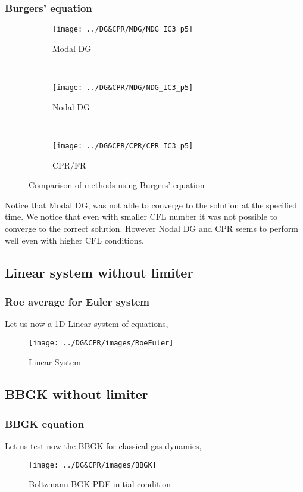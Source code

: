 \begin{frame} \frametitle{Burgers' equation}
	\begin{figure}
        \centering
        \begin{subfigure}[b]{0.31\textwidth}
                \centering
                \texttt{[image: ../DG\&CPR/MDG/MDG\_IC3\_p5]}
                \caption{Modal DG}
                \label{fig:MDG_IC3_p5_averages}
        \end{subfigure}%
				~
        \begin{subfigure}[b]{0.31\textwidth}
                \centering
                \texttt{[image: ../DG\&CPR/NDG/NDG\_IC3\_p5]}
                \caption{Nodal DG}
                \label{fig:NDG_IC3_p5_averages}
        \end{subfigure}
				~
        \begin{subfigure}[b]{0.31\textwidth}
								\centering
                \texttt{[image: ../DG\&CPR/CPR/CPR\_IC3\_p5]}
                \caption{CPR/FR}
                \label{fig:CPR_IC3_p5_averages}
        \end{subfigure}
				\caption{Comparison of methods using Burgers' equation}
				\label{fig:compareBurgers_p5averages}
	\end{figure}
	Notice that Modal DG, was not able to converge to the solution at the specified time. We notice that even with smaller CFL number it was not possible to converge to the correct solution. However Nodal DG and CPR seems to perform well even with higher CFL conditions.
\end{frame}

\subsection{Linear system without limiter}

\begin{frame} \frametitle{Roe average for Euler system}
	Let us now a 1D Linear system of equations,
	\begin{figure}
		\centering
		\texttt{[image: ../DG\&CPR/images/RoeEuler]}
		\caption{Linear System}
		\label{fig:linearSystem}
	\end{figure}
\end{frame}

\subsection{BBGK without limiter}

\begin{frame} \frametitle{BBGK equation}
	Let us test now the BBGK for classical gas dynamics,
	\begin{figure}
		\centering
		\texttt{[image: ../DG\&CPR/images/BBGK]}
		\caption{Boltzmann-BGK PDF initial condition}
		\label{fig:BBGK_IC}
	\end{figure}
\end{frame}


